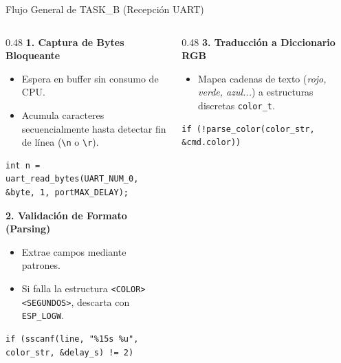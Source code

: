 \documentclass[10pt, aspectratio=169]{beamer} %
\begin{document}
\begin{frame}[fragile]{Flujo General de TASK\_B (Recepción UART)}
    \begin{columns}[T] %
        
        \begin{column}{0.48\textwidth}
            \textbf{1. Captura de Bytes Bloqueante}
            \begin{itemize}
                \item Espera en buffer sin consumo de CPU.
                \item Acumula caracteres secuencialmente hasta detectar fin de línea (\texttt{\textbackslash n} o \texttt{\textbackslash r}).
            \end{itemize}
            \begin{lstlisting}[basicstyle=\ttfamily\tiny]
int n = uart_read_bytes(UART_NUM_0, &byte, 1, portMAX_DELAY);
            \end{lstlisting}
            
            \vspace{0.2cm}
            \textbf{2. Validación de Formato (Parsing)}
            \begin{itemize}
                \item Extrae campos mediante patrones.
                \item Si falla la estructura \texttt{<COLOR> <SEGUNDOS>}, descarta con \texttt{ESP\_LOGW}.
            \end{itemize}
            \begin{lstlisting}[basicstyle=\ttfamily\tiny]
if (sscanf(line, "%15s %u", color_str, &delay_s) != 2)
            \end{lstlisting}
        \end{column}
        
        \begin{column}{0.48\textwidth}
            \textbf{3. Traducción a Diccionario RGB}
            \begin{itemize}
                \item Mapea cadenas de texto (\textit{rojo, verde, azul...}) a estructuras discretas \texttt{color\_t}.
            \end{itemize}
            \begin{lstlisting}[basicstyle=\ttfamily\tiny]
if (!parse_color(color_str, &cmd.color))
            \end{lstlisting}
            

\end{column}
\end{columns}
\end{frame}
\end{document}
